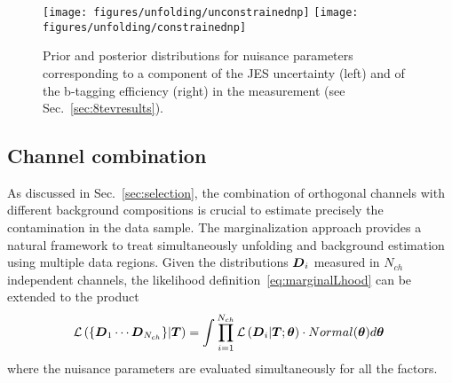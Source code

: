\begin{figure}[!htb]\centering
  \texttt{[image: figures/unfolding/unconstrainednp]}
  \texttt{[image: figures/unfolding/constrainednp]}
  \caption{Prior and posterior distributions for nuisance parameters
    corresponding to a component of the JES uncertainty (left) and of
    the b-tagging efficiency (right) in the \eighttev{} measurement
    (see Sec.~\ref{sec:8tevresults}).}
  \label{fig:nuispar}
\end{figure}

\subsection{Channel combination}

As discussed in Sec.~\ref{sec:selection}, the combination of
orthogonal channels with different background compositions is crucial
to estimate precisely the \wjets{} contamination in the \eighttev{}
data sample.
The marginalization approach provides a natural framework to treat
simultaneously unfolding and background estimation using
multiple data regions. Given the distributions $\boldsymbol{D}{}_i$ measured in $N_{ch}$
independent channels, the likelihood definition~\ref{eq:marginalLhood}
can be extended to the product  
\begin{equation}
  \mathcal{L}\left(\{\boldsymbol{D}{}_1\cdots{}\boldsymbol{D}{}_{N_{ch}}\}|\boldsymbol{T}{}\right)=
  \int
  \prod_{i=1}^{N_{ch}}\mathcal{L}\left(\boldsymbol{D}{}_i|\boldsymbol{T}{};\boldsymbol{\theta}{}\right) 
  \cdot{} Normal(\boldsymbol{\theta}{})
  d\boldsymbol{\theta}{}\phantom{,}
\end{equation}
where the nuisance parameters are evaluated simultaneously for all the
factors.